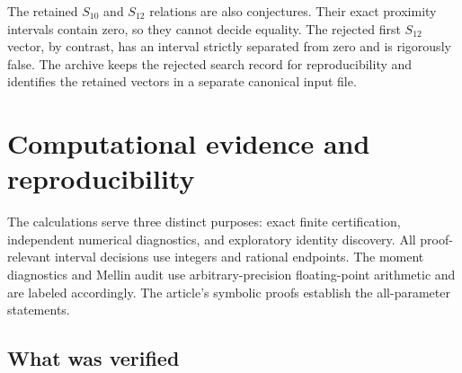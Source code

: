 \documentclass[11pt,letterpaper]{article}
\theoremstyle{definition}
\theoremstyle{remark}
\begin{document}
The retained $S_{10}$ and $S_{12}$ relations are also conjectures.
Their exact proximity intervals contain zero, so they cannot decide
equality. The rejected first $S_{12}$ vector, by contrast, has an interval
strictly separated from zero and is rigorously false. The archive keeps
the rejected search record for reproducibility and identifies the
retained vectors in a separate canonical input file.

\section{Computational evidence and reproducibility}
\label{sec:computation}

The calculations serve three distinct purposes: exact finite
certification, independent numerical diagnostics, and exploratory
identity discovery. All proof-relevant interval decisions use integers
and rational endpoints. The moment diagnostics and Mellin audit use
arbitrary-precision floating-point arithmetic and are labeled accordingly.
The article's symbolic proofs establish the all-parameter statements.

\subsection{What was verified}
\end{document}
